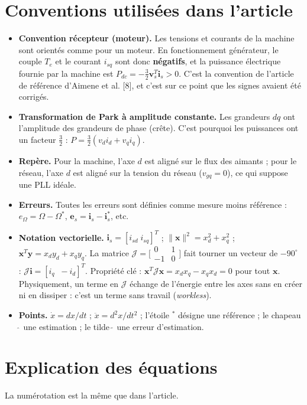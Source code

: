 \documentclass[11pt,a4paper]{article}
\newcommand{\bv}[1]{\mathbf{#1}}
\newcommand{\Jm}{\boldsymbol{\mathcal{J}}}
\begin{document}
\section{Conventions utilisées dans l'article}
\begin{itemize}[itemsep=3pt]
\item \textbf{Convention récepteur (moteur).} Les tensions et courants de la machine sont orientés comme pour un
moteur. En fonctionnement générateur, le couple $T_e$ et le courant $i_{sq}$ sont donc \textbf{négatifs}, et la
puissance électrique fournie par la machine est $P_{dc}=-\frac32\bv v_s^T\bv i_s>0$. C'est la convention
de l'article de référence d'Aimene et al. [8], et c'est sur ce point que les signes avaient été corrigés.
\item \textbf{Transformation de Park à amplitude constante.} Les grandeurs $dq$ ont l'amplitude des
grandeurs de phase (crête). C'est pourquoi les puissances ont un facteur $\frac32$ : $P=\frac32(v_di_d+v_qi_q)$.
\item \textbf{Repère.} Pour la machine, l'axe $d$ est aligné sur le flux des aimants ; pour le réseau,
l'axe $d$ est aligné sur la tension du réseau ($v_{gq}=0$), ce qui suppose une PLL idéale.
\item \textbf{Erreurs.} Toutes les erreurs sont définies comme \og mesure moins référence\fg{} :
$e_\Omega=\Omega-\Omega^*$, $\bv e_s=\bv i_s-\bv i_s^*$, etc.
\item \textbf{Notation vectorielle.} $\bv i_s=[i_{sd}\;i_{sq}]^T$ ; $\|\bv x\|^2=x_d^2+x_q^2$ ;
$\bv x^T\bv y=x_dy_d+x_qy_q$. La matrice $\Jm=\bigl[\begin{smallmatrix}0&1\\-1&0\end{smallmatrix}\bigr]$
fait tourner un vecteur de $-90^\circ$ : $\Jm\bv i=[i_q\;\;-i_d]^T$. Propriété clé :
$\bv x^T\Jm\bv x=x_dx_q-x_qx_d=0$ pour tout $\bv x$. Physiquement, un terme en $\Jm$ échange de l'énergie
entre les axes sans en créer ni en dissiper : c'est un terme \og sans travail\fg{} (\emph{workless}).
\item \textbf{Points.} $\dot x=dx/dt$ ; $\ddot x=d^2x/dt^2$ ; l'étoile $^*$ désigne une référence ;
le chapeau $\hat{\ }$ une estimation ; le tilde $\tilde{\ }$ une erreur d'estimation.
\end{itemize}

\section{Explication des équations}
La numérotation est la même que dans l'article.
\end{document}
